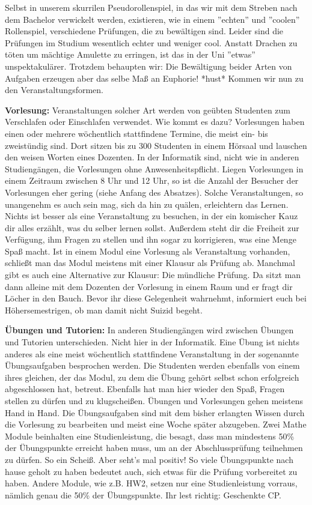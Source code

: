 \spaltenanfang
Selbst in unserem skurrilen Pseudorollenspiel, in das wir mit dem Streben nach dem Bachelor verwickelt werden, existieren, wie in einem ''echten'' und ''coolen'' Rollenspiel, verschiedene Prüfungen, die zu bewältigen sind. Leider sind die Prüfungen im Studium wesentlich echter und weniger cool. Anstatt Drachen zu töten um mächtige Amulette zu erringen, ist das in der Uni ''etwas'' unspektakulärer. Trotzdem behaupten wir: Die Bewältigung beider Arten von Aufgaben erzeugen aber das selbe Maß an Euphorie! *hust* 
Kommen wir nun zu den Veranstaltungsformen.

\textbf{Vorlesung: } Veranstaltungen solcher Art werden von geübten Studenten
zum Verschlafen oder Einschlafen verwendet. Wie kommt es dazu? Vorlesungen
haben einen oder mehrere wöchentlich stattfindene Termine, die meist ein- bis
zweistündig sind. Dort sitzen bis zu 300 Studenten in einem Hörsaal und
lauschen den weisen Worten eines Dozenten. In der Informatik sind, nicht wie in
anderen Studiengängen, die Vorlesungen ohne Anwesenheitspflicht. Liegen
Vorlesungen in einem Zeitraum zwischen 8 Uhr und 12 Uhr, so ist die Anzahl der
Besucher der Vorlesungen eher gering (siehe Anfang des Absatzes). Solche
Veranstaltungen, so unangenehm es auch sein mag, sich da hin zu quälen,
erleichtern das Lernen. Nichts ist besser als eine Veranstaltung zu besuchen,
in der ein komischer Kauz dir alles erzählt, was du selber lernen sollst.
Außerdem steht dir die Freiheit zur Verfügung, ihm Fragen zu stellen und ihn
sogar zu korrigieren, was eine Menge Spaß macht. Ist in einem Modul eine
Vorlesung als Veranstaltung vorhanden, schließt man das Modul meistens mit
einer Klausur als Prüfung ab. Manchmal gibt es auch eine Alternative zur
Klausur: Die mündliche Prüfung. Da sitzt man dann alleine mit dem Dozenten der
Vorlesung in einem Raum und er fragt dir Löcher in den Bauch. Bevor ihr diese
Gelegenheit wahrnehmt, informiert euch bei Höhersemestrigen, ob man damit nicht
Suizid begeht.

\textbf{Übungen und Tutorien: }
In anderen Studiengängen wird zwischen Übungen und Tutorien unterschieden. Nicht hier in der Informatik. Eine Übung ist nichts anderes als eine meist wöchentlich stattfindene Veranstaltung in der sogenannte Übungsaufgaben besprochen werden. Die Studenten werden ebenfalls von einem ihres gleichen, der das Modul, zu dem die Übung gehört selbst schon erfolgreich abgeschlossen hat, betreut. Ebenfalls hat man hier wieder den Spaß, Fragen stellen zu dürfen und zu klugscheißen. Übungen und Vorlesungen gehen meistens Hand in Hand. Die Übungsaufgaben sind mit dem bisher erlangten Wissen durch die Vorlesung zu bearbeiten und meist eine Woche später abzugeben. Zwei Mathe Module beinhalten eine Studienleistung, die besagt, dass man mindestens 50\% der Übungspunkte erreicht haben muss, um an der Abschlussprüfung teilnehmen zu dürfen. So ein Scheiß. Aber seht's mal positiv! So viele Übungspunkte nach hause geholt zu haben bedeutet auch, sich etwas für die Prüfung vorbereitet zu haben. Andere Module, wie z.B. HW2, setzen nur eine Studienleistung vorraus, nämlich genau die 50\% der Übungspunkte. Ihr lest richtig: Geschenkte CP.

